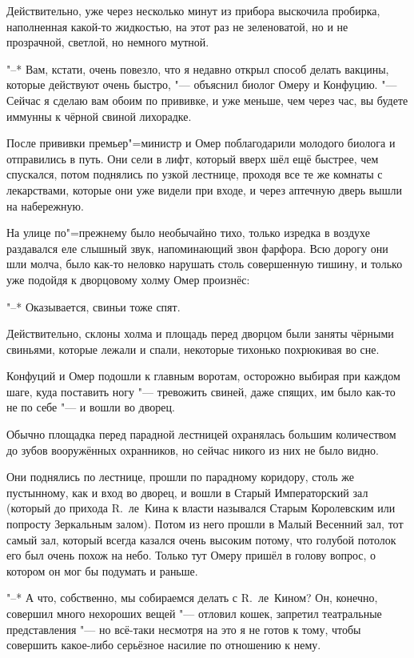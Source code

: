 Действительно, уже через несколько минут из прибора выскочила пробирка,
наполненная какой-то жидкостью, на этот раз не зеленоватой, но и не прозрачной,
светлой, но немного мутной.

"--* Вам, кстати, очень повезло, что я недавно открыл способ делать вакцины,
которые действуют очень быстро, "--- объяснил биолог Омеру и Конфуцию.
"--- Сейчас я сделаю вам обоим по прививке, и уже меньше, чем через час, вы
будете иммунны к чёрной свиной лихорадке.

После прививки премьер"=министр и Омер поблагодарили молодого биолога и
отправились в путь.
Они сели в лифт, который вверх шёл ещё быстрее, чем спускался, потом поднялись
по узкой лестнице, проходя все те же комнаты с лекарствами, которые они уже
видели при входе, и через аптечную дверь вышли на набережную.

На улице по"=прежнему было необычайно тихо, только изредка в воздухе раздавался
еле слышный звук, напоминающий звон фарфора.
Всю дорогу они шли молча, было как-то неловко нарушать столь совершенную тишину,
и только уже подойдя к дворцовому холму Омер произнёс:

"--* Оказывается, свиньи тоже спят.

Действительно, склоны холма и площадь перед дворцом были заняты чёрными
свиньями, которые лежали и спали, некоторые тихонько похрюкивая во сне.

Конфуций и Омер подошли к главным воротам, осторожно выбирая при каждом шаге,
куда поставить ногу "--- тревожить свиней, даже спящих, им было как-то не по
себе "--- и вошли во дворец.

Обычно площадка перед парадной лестницей охранялась большим количеством до зубов
вооружённых охранников, но сейчас никого из них не было видно.

Они поднялись по лестнице, прошли по парадному коридору, столь же пустынному,
как и вход во дворец, и вошли в Старый Императорский зал (который до прихода
R.~ле~Кина к власти назывался Старым Королевским или попросту Зеркальным залом).
Потом из него прошли в Малый Весенний зал, тот самый зал, который всегда казался
очень высоким потому, что голубой потолок его был очень похож на небо.
Только тут Омеру пришёл в голову вопрос, о котором он мог бы подумать и раньше.

"--* А что, собственно, мы собираемся делать с R.~ле~Кином?
Он, конечно, совершил много нехороших вещей "--- отловил кошек, запретил
театральные представления "--- но всё-таки несмотря на это я не готов к тому,
чтобы совершить какое-либо серьёзное насилие по отношению к нему.

